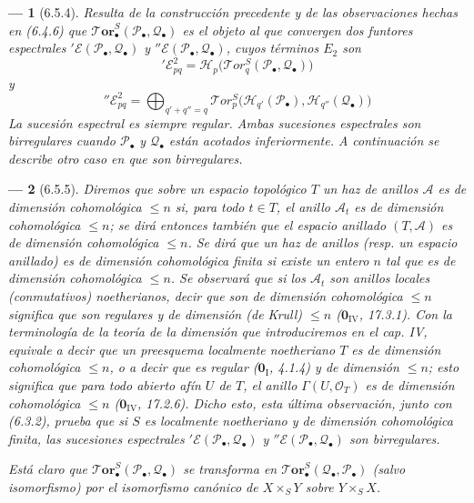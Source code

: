 \documentclass[10pt,oneside,openany]{book}
\theoremstyle{egaenv}\newtheorem*{env}{---}
\theoremstyle{egastatement}
\theoremstyle{egadescription}
\newcommand{\oldpage}[2][]{\marginnote{\normalfont\scriptsize\textbf{#1}\,|\,#2}\ignorespaces}
\begin{document}
\begin{env}[6.5.4]
Resulta de la construcción precedente y de las observaciones hechas en (6.4.6) que $\boldsymbol{\mathscr{T}\!or}_\bullet^S(\mathscr P_\bullet,\mathscr Q_\bullet)$ es el objeto al
que convergen dos funtores espectrales
$'\mathscr E(\mathscr P_\bullet,\mathscr Q_\bullet)$ y
$''\mathscr E(\mathscr P_\bullet,\mathscr Q_\bullet)$, cuyos términos $E_2$ son
\[
  '\mathscr E_{pq}^2
  =\mathscr H_p\bigl(\mathscr{T}\!or_q^S
    (\mathscr P_\bullet,\mathscr Q_\bullet)\bigr)
  \tag{6.5.4.1}\label{III.6.5.4.1.fr}
\]
y
\[
  ''\mathscr E_{pq}^2
  =\bigoplus_{q'+q''=q}
   \mathscr{T}\!or_p^S
   \bigl(\mathscr H_{q'}(\mathscr P_\bullet),
         \mathscr H_{q''}(\mathscr Q_\bullet)\bigr)
  \tag{6.5.4.2}\label{III.6.5.4.2.fr}
\]
La sucesión espectral  es siempre regular.
Ambas sucesiones espectrales son birregulares cuando
$\mathscr P_\bullet$ y $\mathscr Q_\bullet$ están \emph{acotados inferiormente}.
A continuación se describe otro caso en que son birregulares.
\end{env}

\begin{env}[6.5.5]
Diremos que sobre un espacio topológico $T$ un haz de anillos
$\mathscr A$ es \emph{de dimensión cohomológica $\leqslant n$} si, para todo
$t\in T$, el anillo $\mathscr A_t$ es de dimensión cohomológica $\leqslant n$;
se dirá entonces también que el \emph{espacio anillado} $(T,\mathscr A)$ es
\emph{de dimensión cohomológica $\leqslant n$}. Se dirá que un haz
de anillos (resp. un espacio anillado) es de dimensión cohomológica \emph{finita}
si existe un entero $n$ tal que es de dimensión cohomológica
$\leqslant n$. Se observará que si los $\mathscr A_t$ son \emph{anillos locales
(conmutativos) noetherianos},
\oldpage[III]{150}
decir que son de dimensión cohomológica $\leqslant n$ significa que son
\emph{regulares} y de \emph{dimensión} (de Krull) $\leqslant n$ ($\mathbf{0}_{\mathrm{IV}}$, 17.3.1).
Con la terminología de la teoría de la dimensión que introduciremos en el
cap. IV, equivale a decir que un \emph{preesquema localmente noetheriano} $T$
es de \emph{dimensión cohomológica} $\leqslant n$, o a decir que es \emph{regular}
($\mathbf{0}_{\mathrm I}$, 4.1.4) y de \emph{dimensión} $\leqslant n$; esto significa que para
todo abierto afín $U$ de $T$, el anillo $\Gamma(U,\mathscr O_T)$ es \emph{de
dimensión cohomológica} $\leqslant n$ ($\mathbf{0}_{\mathrm{IV}}$, 17.2.6). Dicho esto,
esta última observación, junto con (6.3.2), prueba que si $S$ es \emph{localmente
noetheriano y de dimensión cohomológica finita}, las sucesiones espectrales
$'\mathscr E(\mathscr P_\bullet,\mathscr Q_\bullet)$ y
$''\mathscr E(\mathscr P_\bullet,\mathscr Q_\bullet)$ son \emph{birregulares}.

Está claro que
$\boldsymbol{\mathscr{T}\!or}_\bullet^S(\mathscr P_\bullet,\mathscr Q_\bullet)$ se
transforma en
$\boldsymbol{\mathscr{T}\!or}_\bullet^S(\mathscr Q_\bullet,\mathscr P_\bullet)$ (salvo
isomorfismo) por el isomorfismo canónico de $X\times_S Y$ sobre
$Y\times_S X$.
\end{env}
\end{document}
